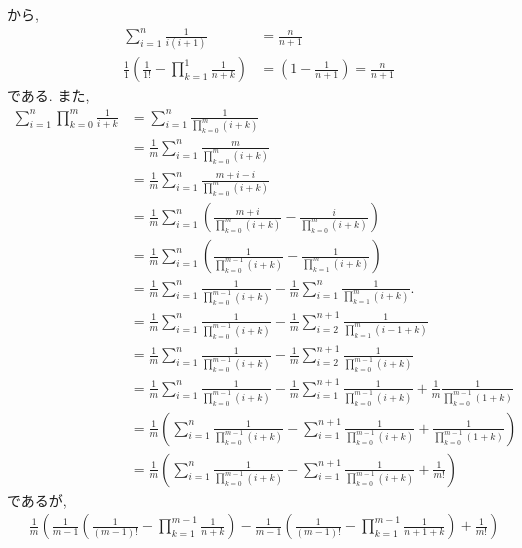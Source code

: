 \begin{proof**}
  から,
  \begin{align*}
    \sum_{i=1}^n\frac{1}{i(i+1)}
    &=\frac{n}{n+1}\\
    \frac{1}{1}\left(\frac{1}{1!}-\prod_{k=1}^1\frac{1}{n+k}\right)
    &=
    \left(1-\frac{1}{n+1}\right)
    =\frac{n}{n+1}
  \end{align*}
  である.
  また,
  \begin{align*}
    \sum_{i=1}^n\prod_{k=0}^{m}\frac{1}{i+k}
    &=
    \sum_{i=1}^n\frac{1}{\prod_{k=0}^{m}(i+k)}\\
    &=
    \frac{1}{m}\sum_{i=1}^n\frac{m}{\prod_{k=0}^{m}(i+k)}\\
    &=
    \frac{1}{m}\sum_{i=1}^n\frac{m+i-i}{\prod_{k=0}^{m}(i+k)}\\
    &=
    \frac{1}{m}\sum_{i=1}^n\left(\frac{m+i}{\prod_{k=0}^{m}(i+k)}-\frac{i}{\prod_{k=0}^{m}(i+k)}\right)\\
    &=
    \frac{1}{m}\sum_{i=1}^n\left(\frac{1}{\prod_{k=0}^{m-1}(i+k)}-\frac{1}{\prod_{k=1}^{m}(i+k)}\right)\\
    &=
    \frac{1}{m}\sum_{i=1}^n\frac{1}{\prod_{k=0}^{m-1}(i+k)}-\frac{1}{m}\sum_{i=1}^n\frac{1}{\prod_{k=1}^{m}(i+k)}.\\
    &=
    \frac{1}{m}\sum_{i=1}^n\frac{1}{\prod_{k=0}^{m-1}(i+k)}-\frac{1}{m}\sum_{i=2}^{n+1}\frac{1}{\prod_{k=1}^{m}(i-1+k)}\\
    &=
    \frac{1}{m}\sum_{i=1}^n\frac{1}{\prod_{k=0}^{m-1}(i+k)}-\frac{1}{m}\sum_{i=2}^{n+1}\frac{1}{\prod_{k=0}^{m-1}(i+k)}\\
    &=
    \frac{1}{m}\sum_{i=1}^n\frac{1}{\prod_{k=0}^{m-1}(i+k)}-\frac{1}{m}\sum_{i=1}^{n+1}\frac{1}{\prod_{k=0}^{m-1}(i+k)}
    +\frac{1}{m}\frac{1}{\prod_{k=0}^{m-1}(1+k)}\\
    &=
    \frac{1}{m}\left(\sum_{i=1}^n\frac{1}{\prod_{k=0}^{m-1}(i+k)}-\sum_{i=1}^{n+1}\frac{1}{\prod_{k=0}^{m-1}(i+k)}
    +\frac{1}{\prod_{k=0}^{m-1}(1+k)}\right)\\
    &=
    \frac{1}{m}\left(\sum_{i=1}^n\frac{1}{\prod_{k=0}^{m-1}(i+k)}-\sum_{i=1}^{n+1}\frac{1}{\prod_{k=0}^{m-1}(i+k)}
    +\frac{1}{m!}\right)
  \end{align*}
  であるが,
  \begin{align*}
    &\frac{1}{m}\left(
    \frac{1}{m-1}\left(\frac{1}{(m-1)!}-\prod_{k=1}^{m-1}\frac{1}{n+k}\right)
    -\frac{1}{m-1}\left(\frac{1}{(m-1)!}-\prod_{k=1}^{m-1}\frac{1}{n+1+k}\right)
    +\frac{1}{m!}\right)\\

\end{align*}
\end{proof**}
